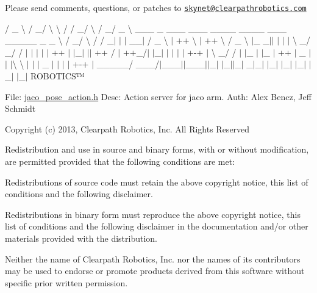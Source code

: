 Please send comments, questions, or patches to \href{mailto:skynet@clearpathrobotics.com}{\tt skynet@clearpathrobotics.\+com}



 / \+\_\+ \textbackslash{} / \+\_\+/ \textbackslash{} \textbackslash{} / / \+\_\+/ \textbackslash{} / \+\_\+/ \+\_\+ \textbackslash{} \+\_\+\+\_\+\+\_\+ \+\_\+ \+\_\+\+\_\+\+\_\+ \+\_\+\+\_\+\+\_\+ \+\_\+\+\_\+\+\_\+\+\_\+ \+\_\+\+\_\+\+\_\+\+\_\+ \+\_\+\+\_\+\+\_\+ \+\_\+\+\_\+\+\_\+\+\_\+\+\_\+ \+\_\+ \+\_\+ \textbackslash{} / \+\_\+/ \textbackslash{} / / \+\_\+$|$ $\vert$ $\vert$ \+\_\+\+\_\+$\vert$ / \+\_\+ \textbackslash{} $\vert$ ++ \textbackslash{} $\vert$ ++ \textbackslash{} / \+\_\+ \textbackslash{} $\vert$\+\_\+ \+\_\+$\vert$$\vert$ $\vert$ $\vert$ $\vert$ \textbackslash{} \+\_\+/ \+\_\+/ / $\vert$ $\vert$ $\vert$ $\vert$ $\vert$ ++ $\vert$ $\vert$\+\_\+$\vert$ $\vert$$\vert$ ++ / $\vert$ ++\+\_\+/$\vert$ $\vert$\+\_\+$\vert$ $\vert$ $\vert$ $\vert$ $\vert$ +-\/+ $\vert$ \textbackslash{} \+\_\+/ / $\vert$ $\vert$\+\_\+ $\vert$ $\vert$\+\_\+ $\vert$ ++ $\vert$ \+\_\+ $\vert$$\vert$ $\vert$\textbackslash{} \textbackslash{} $\vert$ $\vert$ $\vert$ \+\_\+ $\vert$ $\vert$ $\vert$ $\vert$ +-\/+ $\vert$ \+\_\+\+\_\+\+\_\+\+\_\+\+\_\+/ \+\_\+\+\_\+\+\_\+/$\vert$\+\_\+\+\_\+\+\_\+$\vert$$\vert$\+\_\+\+\_\+\+\_\+$\vert$$\vert$\+\_\+$\vert$ $\vert$\+\_\+$\vert$$\vert$\+\_\+$\vert$ \+\_\+$|$\+\_\+$\vert$ $\vert$\+\_\+$\vert$ $\vert$\+\_\+$\vert$ $\vert$\+\_\+$\vert$ $\vert$\+\_\+$\vert$ $\vert$\+\_\+$\vert$ R\+O\+B\+O\+T\+I\+C\+S™

File\+: \hyperlink{jaco__pose__action_8h}{jaco\+\_\+pose\+\_\+action.\+h} Desc\+: Action server for jaco arm. Auth\+: Alex Bencz, Jeff Schmidt

Copyright (c) 2013, Clearpath Robotics, Inc. All Rights Reserved

Redistribution and use in source and binary forms, with or without modification, are permitted provided that the following conditions are met\+:
\begin{DoxyItemize}
\item Redistributions of source code must retain the above copyright notice, this list of conditions and the following disclaimer.
\item Redistributions in binary form must reproduce the above copyright notice, this list of conditions and the following disclaimer in the documentation and/or other materials provided with the distribution.
\item Neither the name of Clearpath Robotics, Inc. nor the names of its contributors may be used to endorse or promote products derived from this software without specific prior written permission.
\end{DoxyItemize}

